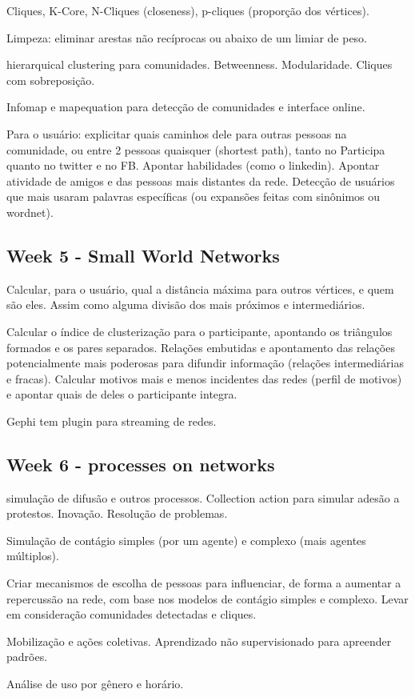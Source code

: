 \documentclass[12pt]{report}
\begin{document}
Cliques, K-Core, N-Cliques (closeness), p-cliques (proporção dos vértices).

Limpeza: eliminar arestas não recíprocas ou abaixo de um limiar de peso.

hierarquical clustering para comunidades. Betweenness. Modularidade. Cliques com sobreposição.

Infomap e mapequation para detecção de comunidades e interface online.

Para o usuário: explicitar quais caminhos dele para outras pessoas na comunidade, ou entre 2 pessoas quaisquer (shortest path), tanto no Participa quanto no twitter e no FB. Apontar habilidades (como o linkedin). Apontar atividade de amigos e das pessoas mais distantes da rede. Detecção de usuários que mais usaram palavras específicas (ou expansões feitas com sinônimos ou wordnet).
\subsection{Week 5 - Small World Networks}
Calcular, para o usuário, qual a distância máxima para outros vértices, e quem são eles. Assim como alguma divisão dos mais próximos e intermediários.

Calcular o índice de clusterização para o participante, apontando os triângulos formados e os pares separados. Relações embutidas e apontamento das relações potencialmente mais poderosas para difundir informação (relações intermediárias e fracas). Calcular motivos mais e menos incidentes das redes (perfil de motivos) e apontar quais de deles o participante integra.

Gephi tem plugin para streaming de redes.
\subsection{Week 6 - processes on networks}
simulação de difusão e outros processos. Collection action para simular adesão a protestos. Inovação. Resolução de problemas.

Simulação de contágio simples (por um agente) e complexo (mais agentes múltiplos).

Criar mecanismos de escolha de pessoas para influenciar, de forma a aumentar a repercussão na rede, com base nos modelos de contágio simples e complexo. Levar em consideração comunidades detectadas e cliques.

Mobilização e ações coletivas. Aprendizado não supervisionado para apreender padrões.

Análise de uso por gênero e horário.
\end{document}
